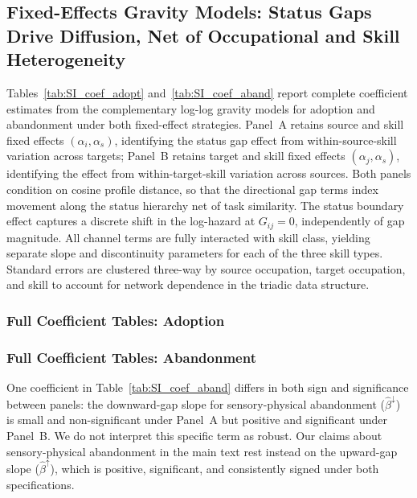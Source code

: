 \documentclass[11pt, letterpaper]{article} %
\begin{document}

 



\subsection{Fixed-Effects Gravity Models: Status Gaps Drive Diffusion, Net of Occupational and Skill Heterogeneity}
\label{sec:SI_coef_tables}

Tables~\ref{tab:SI_coef_adopt} and~\ref{tab:SI_coef_aband} report complete coefficient estimates from the complementary log-log gravity models for adoption and abandonment under both fixed-effect strategies. Panel~A retains source and skill fixed effects $(\alpha_i, \alpha_s)$, identifying the status gap effect from within-source-skill variation across targets; Panel~B retains target and skill fixed effects $(\alpha_j, \alpha_s)$, identifying the effect from within-target-skill variation across sources. Both panels condition on cosine profile distance, so that the directional gap terms index movement along the status hierarchy net of task similarity. The status boundary effect captures a discrete shift in the log-hazard at $G_{ij} = 0$, independently of gap magnitude. All channel terms are fully interacted with skill class, yielding separate slope and discontinuity parameters for each of the three skill types. Standard errors are clustered three-way by source occupation, target occupation, and skill to account for network dependence in the triadic data structure.

\subsubsection{Full Coefficient Tables: Adoption}
\label{sec:SI_coef_adopt}



\subsubsection{Full Coefficient Tables: Abandonment}
\label{sec:SI_coef_aband}



One coefficient in Table~\ref{tab:SI_coef_aband} differs in both sign and significance between panels: the downward-gap slope for sensory-physical abandonment ($\hat{\beta}^{\downarrow}$) is small and non-significant under Panel~A but positive and significant under Panel~B. We do not interpret this specific term as robust. Our claims about sensory-physical abandonment in the main text rest instead on the upward-gap slope ($\hat{\beta}^{\uparrow}$), which is positive, significant, and consistently signed under both specifications.
\end{document}
